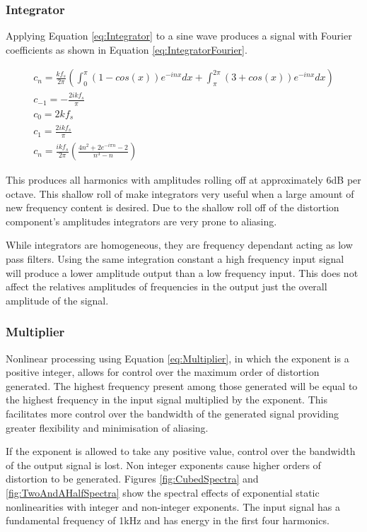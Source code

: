 		\subsubsection*{Integrator}
			Applying Equation \ref{eq:Integrator} to a sine wave produces a signal with Fourier coefficients as
			shown in Equation \ref{eq:IntegratorFourier}.

			\begin{gather}
				c_{n} = \frac{kf_{s}}{2\pi} \left( \int_{0}^{\pi} (1 - cos(x))e^{-inx} dx +
							\int_{\pi}^{2\pi} (3 + cos(x))e^{-inx} dx \right) \nonumber \\
				c_{-1} = - \frac{2ikf_{s}}{\pi} \nonumber \\
				c_{0} = 2kf_{s} \nonumber \\
				c_{1} = \frac{2ikf_{s}}{\pi} \nonumber \\
				c_{n} = \frac{ikf_{s}}{2\pi} \left( \frac{4n^{2} + 2e^{-i\pi n} - 2}{n^{3} - n} \right)
				\label{eq:IntegratorFourier}
			\end{gather}

			This produces all harmonics with amplitudes rolling off at approximately 6dB per octave. This
			shallow roll of make integrators very useful when a large amount of new frequency content is
			desired. Due to the shallow roll off of the distortion component's amplitudes integrators are very
			prone to aliasing.

			While integrators are homogeneous, they are frequency dependant acting as low pass filters. Using
			the same integration constant a high frequency input signal will produce a lower amplitude output
			than a low frequency input. This does not affect the relatives amplitudes of frequencies in the
			output just the overall amplitude of the signal.

		\subsubsection*{Multiplier}
			Nonlinear processing using Equation \ref{eq:Multiplier}, in which the exponent is a positive
			integer, allows for control over the maximum order of distortion generated. The highest frequency
			present among those generated will be equal to the highest frequency in the input signal multiplied
			by the exponent. This facilitates more control over the bandwidth of the generated signal providing
			greater flexibility and minimisation of aliasing.

			If the exponent is allowed to take any positive value, control over the bandwidth of the output
			signal is lost. Non integer exponents cause higher orders of distortion to be generated. Figures
			\ref{fig:CubedSpectra} and \ref{fig:TwoAndAHalfSpectra} show the spectral effects of exponential
			static nonlinearities with integer and non-integer exponents. The input signal has a fundamental
			frequency of 1kHz and has energy in the first four harmonics.

